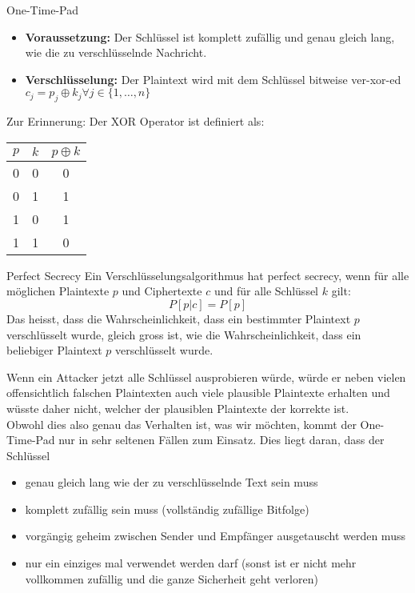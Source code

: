 \begin{concept}{One-Time-Pad}
    \begin{itemize}
        \item \textbf{Voraussetzung:} Der Schlüssel ist komplett zufällig und genau gleich lang, wie die zu verschlüsselnde Nachricht.
        \item \textbf{Verschlüsselung:}
        Der Plaintext wird mit dem Schlüssel bitweise ver-xor-ed
        $c_j = p_j \oplus k_j \forall j \in \{1, \dots, n\}$
    \end{itemize}

    Zur Erinnerung: Der XOR Operator ist definiert als:
    \begin{center}
        \begin{tabular}{c|c|c}
            $p$ & $k$ & $p \oplus k$ \\
            \hline
            0 & 0 & 0 \\
            0 & 1 & 1 \\
            1 & 0 & 1 \\
            1 & 1 & 0 \\
        \end{tabular}
    \end{center}
\end{concept}

\begin{theorem}{Perfect Secrecy}
    Ein Verschlüsselungsalgorithmus hat perfect secrecy, wenn für alle möglichen Plaintexte $p$ und Ciphertexte $c$ und für alle Schlüssel $k$ gilt:
    \begin{equation}
        P[p|c] = P[p]
    \end{equation}
    Das heisst, dass die Wahrscheinlichkeit, dass ein bestimmter Plaintext $p$ verschlüsselt wurde, gleich gross ist, wie die Wahrscheinlichkeit, dass ein beliebiger Plaintext $p$ verschlüsselt wurde.
\end{theorem}

\begin{corollary}
    Wenn ein Attacker jetzt alle Schlüssel ausprobieren würde, würde er neben vielen offensichtlich falschen Plaintexten auch viele plausible Plaintexte erhalten und wüsste daher nicht, welcher der plausiblen Plaintexte der korrekte ist.
    \vspace{2mm}\\
    Obwohl dies also genau das Verhalten ist, was wir möchten, kommt der One-Time-Pad nur in sehr seltenen Fällen zum Einsatz. Dies liegt daran, dass der Schlüssel
    \begin{itemize}
        \item genau gleich lang wie der zu verschlüsselnde Text sein muss
        \item komplett zufällig sein muss (vollständig zufällige Bitfolge)
        \item vorgängig geheim zwischen Sender und Empfänger ausgetauscht werden muss
        \item nur ein einziges mal verwendet werden darf (sonst ist er nicht mehr vollkommen zufällig und die ganze Sicherheit geht verloren)
    \end{itemize}
\end{corollary}

